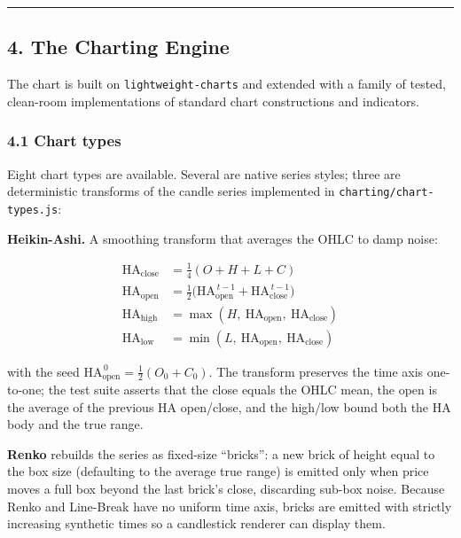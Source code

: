 \documentclass[
  11pt,
]{article}
\begin{document}
\begin{center}\rule{0.5\linewidth}{0.5pt}\end{center}

\subsection{4. The Charting Engine}\label{the-charting-engine}

The chart is built on \texttt{lightweight-charts} and extended with a
family of tested, clean-room implementations of standard chart
constructions and indicators.

\subsubsection{4.1 Chart types}\label{chart-types}

Eight chart types are available. Several are native series styles; three
are deterministic transforms of the candle series implemented in
\texttt{charting/chart-types.js}:

\textbf{Heikin-Ashi.} A smoothing transform that averages the OHLC to
damp noise:

\[
\begin{aligned}
\text{HA}_\text{close} &= \tfrac{1}{4}(O + H + L + C)\\
\text{HA}_\text{open}  &= \tfrac{1}{2}\big(\text{HA}_\text{open}^{\,t-1} + \text{HA}_\text{close}^{\,t-1}\big)\\
\text{HA}_\text{high}  &= \max(H,\ \text{HA}_\text{open},\ \text{HA}_\text{close})\\
\text{HA}_\text{low}   &= \min(L,\ \text{HA}_\text{open},\ \text{HA}_\text{close})
\end{aligned}
\]

with the seed \(\text{HA}_\text{open}^{\,0} = \tfrac{1}{2}(O_0 + C_0)\).
The transform preserves the time axis one-to-one; the test suite asserts
that the close equals the OHLC mean, the open is the average of the
previous HA open/close, and the high/low bound both the HA body and the
true range.

\textbf{Renko} rebuilds the series as fixed-size ``bricks'': a new brick
of height equal to the box size (defaulting to the average true range)
is emitted only when price moves a full box beyond the last brick's
close, discarding sub-box noise. Because Renko and Line-Break have no
uniform time axis, bricks are emitted with strictly increasing synthetic
times so a candlestick renderer can display them.
\end{document}
